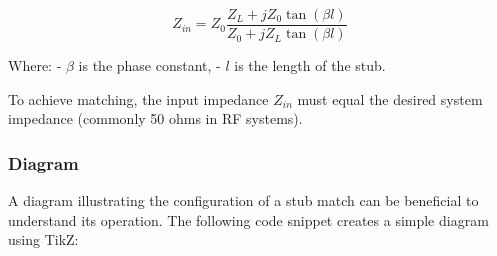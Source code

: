 \[
Z_{in} = Z_0 \frac{Z_L + j Z_0 \tan(\beta l)}{Z_0 + j Z_L \tan(\beta l)}
\]

Where:
- \( \beta \) is the phase constant,
- \( l \) is the length of the stub.

To achieve matching, the input impedance \( Z_{in} \) must equal the desired system impedance (commonly 50 ohms in RF systems).

\subsubsection{Diagram}

A diagram illustrating the configuration of a stub match can be beneficial to understand its operation. The following code snippet creates a simple diagram using TikZ:

\begin{center}
\end{center}
